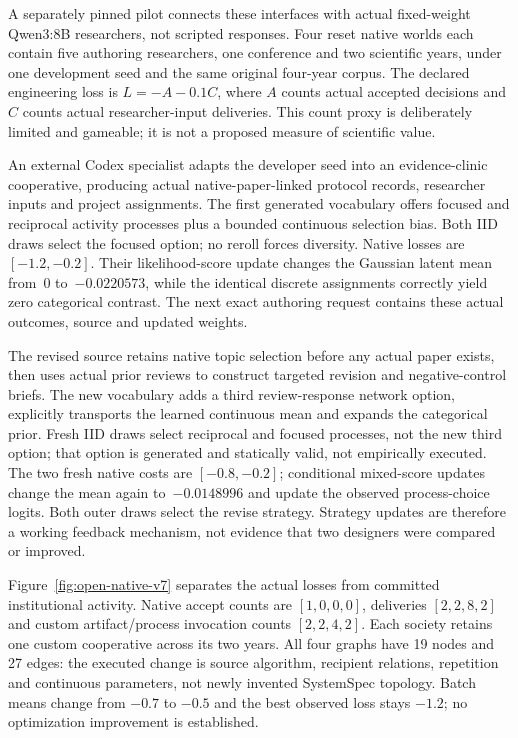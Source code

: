 A separately pinned pilot connects these interfaces with actual fixed-weight
Qwen3:8B researchers, not scripted responses. Four reset native worlds each
contain five authoring researchers, one conference and two scientific years,
under one development seed and the same original four-year corpus. The declared
engineering loss is $L=-A-0.1C$, where $A$ counts actual accepted decisions and
$C$ counts actual researcher-input deliveries. This count proxy is deliberately
limited and gameable; it is not a proposed measure of scientific value.

An external Codex specialist adapts the developer seed into an evidence-clinic
cooperative, producing actual native-paper-linked protocol records, researcher
inputs and project assignments. The first generated vocabulary offers focused
and reciprocal activity processes plus a bounded continuous selection bias.
Both IID draws select the focused option; no reroll forces diversity. Native
losses are $[-1.2,-0.2]$. Their likelihood-score update changes the Gaussian
latent mean from~0 to~$-0.0220573$, while the identical discrete assignments
correctly yield zero categorical contrast. The next exact authoring request
contains these actual outcomes, source and updated weights.

The revised source retains native topic selection before any actual paper exists,
then uses actual prior reviews to construct targeted revision and negative-control
briefs. The new vocabulary adds a third review-response network option, explicitly
transports the learned continuous mean and expands the categorical prior. Fresh
IID draws select reciprocal and focused processes, not the new third option;
that option is generated and statically valid, not empirically executed. The two
fresh native costs are $[-0.8,-0.2]$; conditional mixed-score updates change the
mean again to~$-0.0148996$ and update the observed process-choice logits. Both
outer draws select the revise strategy. Strategy updates are therefore a working
feedback mechanism, not evidence that two designers were compared or improved.

Figure~\ref{fig:open-native-v7} separates the actual losses from committed
institutional activity. Native accept counts are $[1,0,0,0]$, deliveries
$[2,2,8,2]$ and custom artifact/process invocation counts $[2,2,4,2]$.
Each society retains one custom cooperative across its two years. All four
graphs have 19 nodes and 27 edges: the executed change is source algorithm,
recipient relations, repetition and continuous parameters, not newly invented
SystemSpec topology. Batch means change from $-0.7$ to $-0.5$ and the best observed
loss stays $-1.2$; no optimization improvement is established.

